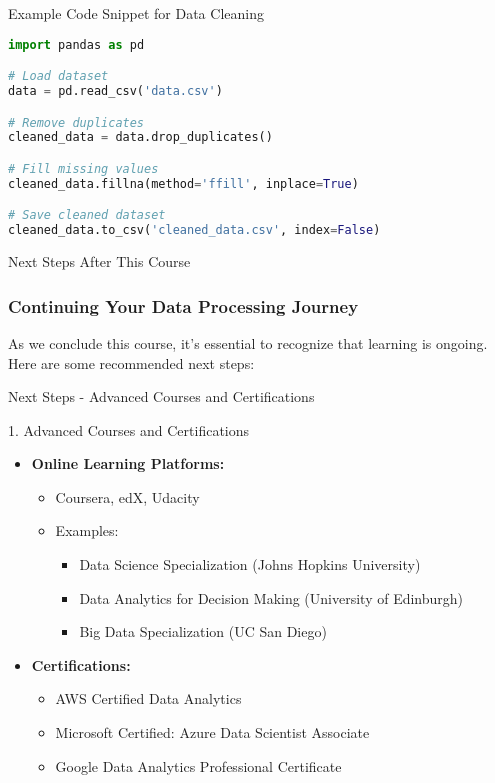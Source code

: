 \documentclass[aspectratio=169]{beamer}
\begin{document}
\begin{frame}[fragile]{Example Code Snippet for Data Cleaning}
    \begin{lstlisting}[language=Python]
import pandas as pd

# Load dataset
data = pd.read_csv('data.csv')

# Remove duplicates
cleaned_data = data.drop_duplicates()

# Fill missing values
cleaned_data.fillna(method='ffill', inplace=True)

# Save cleaned dataset
cleaned_data.to_csv('cleaned_data.csv', index=False)
    \end{lstlisting}
\end{frame}

\begin{frame}[fragile]{Next Steps After This Course}
    \frametitle{Continuing Your Data Processing Journey}
    As we conclude this course, it's essential to recognize that learning is ongoing. Here are some recommended next steps:
\end{frame}

\begin{frame}[fragile]{Next Steps - Advanced Courses and Certifications}
    \begin{block}{1. Advanced Courses and Certifications}
        \begin{itemize}
            \item \textbf{Online Learning Platforms:}
            \begin{itemize}
                \item Coursera, edX, Udacity
                \item Examples:
                \begin{itemize}
                    \item Data Science Specialization (Johns Hopkins University)
                    \item Data Analytics for Decision Making (University of Edinburgh)
                    \item Big Data Specialization (UC San Diego)
                \end{itemize}
            \end{itemize}
            \item \textbf{Certifications:}
            \begin{itemize}
                \item AWS Certified Data Analytics
                \item Microsoft Certified: Azure Data Scientist Associate
                \item Google Data Analytics Professional Certificate
            \end{itemize}
        \end{itemize}
    \end{block}
\end{frame}
\end{document}
